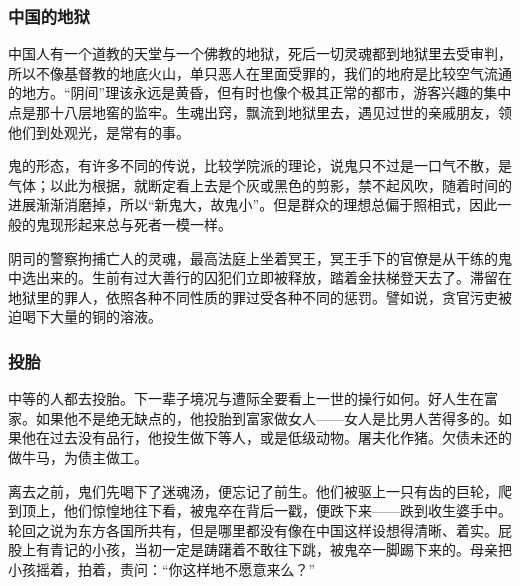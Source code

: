 \subsubsection*{中国的地狱}
\par 中国人有一个道教的天堂与一个佛教的地狱，死后一切灵魂都到地狱里去受审判，所以不像基督教的地底火山，单只恶人在里面受罪的，我们的地府是比较空气流通的地方。“阴间”理该永远是黄昏，但有时也像个极其正常的都市，游客兴趣的集中点是那十八层地窖的监牢。生魂出窍，飘流到地狱里去，遇见过世的亲戚朋友，领他们到处观光，是常有的事。
\par 鬼的形态，有许多不同的传说，比较学院派的理论，说鬼只不过是一口气不散，是气体；以此为根据，就断定看上去是个灰或黑色的剪影，禁不起风吹，随着时间的进展渐渐消磨掉，所以“新鬼大，故鬼小”。但是群众的理想总偏于照相式，因此一般的鬼现形起来总与死者一模一样。
\par 阴司的警察拘捕亡人的灵魂，最高法庭上坐着冥王，冥王手下的官僚是从干练的鬼中选出来的。生前有过大善行的囚犯们立即被释放，踏着金扶梯登天去了。滞留在地狱里的罪人，依照各种不同性质的罪过受各种不同的惩罚。譬如说，贪官污吏被迫喝下大量的铜的溶液。
\subsubsection*{投胎}
\par 中等的人都去投胎。下一辈子境况与遭际全要看上一世的操行如何。好人生在富家。如果他不是绝无缺点的，他投胎到富家做女人——女人是比男人苦得多的。如果他在过去没有品行，他投生做下等人，或是低级动物。屠夫化作猪。欠债未还的做牛马，为债主做工。
\par 离去之前，鬼们先喝下了迷魂汤，便忘记了前生。他们被驱上一只有齿的巨轮，爬到顶上，他们惊惶地往下看，被鬼卒在背后一戳，便跌下来——跌到收生婆手中。轮回之说为东方各国所共有，但是哪里都没有像在中国这样设想得清晰、着实。屁股上有青记的小孩，当初一定是踌躇着不敢往下跳，被鬼卒一脚踢下来的。母亲把小孩摇着，拍着，责问：“你这样地不愿意来么？”
